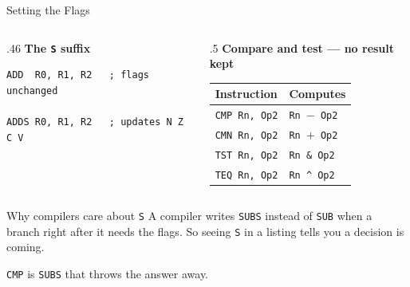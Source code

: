 \documentclass[9pt,aspectratio=169,xcolor=table]{beamer}
\newcommand{\striped}{\rowcolors{1}{white}{stripe}}
\begin{document}
\begin{frame}[fragile]{Setting the Flags}
    \begin{columns}[T]
    \begin{column}{.46\textwidth}
        \textbf{The \texttt{S} suffix}

        \vspace{1mm}
        \begin{lstlisting}[style=armasm, language=ARM, basicstyle=\footnotesize\ttfamily]
ADD  R0, R1, R2   ; flags unchanged

ADDS R0, R1, R2   ; updates N Z C V
        \end{lstlisting}
    \end{column}
    \begin{column}{.5\textwidth}
        \textbf{Compare and test --- no result kept}

        \vspace{1mm}
        {\small
        \striped
        \begin{tabular}{@{}l l@{}}
            \toprule
            \textbf{Instruction} & \textbf{Computes} \\
            \midrule
            \texttt{CMP Rn, Op2} & \texttt{Rn $-$ Op2} \\
            \texttt{CMN Rn, Op2} & \texttt{Rn $+$ Op2} \\
            \texttt{TST Rn, Op2} & \texttt{Rn \& Op2} \\
            \texttt{TEQ Rn, Op2} & \texttt{Rn \^{} Op2} \\
            \bottomrule
        \end{tabular}}
    \end{column}
    \end{columns}

    \vspace{3mm}
    \begin{block}{Why compilers care about \texttt{S}}
        A compiler writes \texttt{SUBS} instead of \texttt{SUB} when a
        branch right after it needs the flags. So seeing \texttt{S} in a
        listing tells you \alert{a decision is coming}.
    \end{block}

    \vspace{1mm}
    {\small \texttt{CMP} is \texttt{SUBS} that throws the answer away.}
\end{frame}
\end{document}
